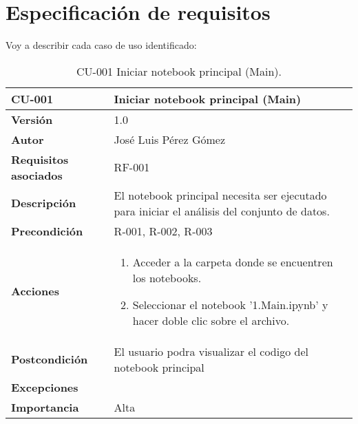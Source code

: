 \section{Especificación de requisitos}

Voy a describir cada caso de uso identificado:


\begin{table}[p]
	\centering
	\begin{tabularx}{\linewidth}{ p{} p{} }
		\toprule
		\textbf{CU-001}    & \textbf{Iniciar notebook principal (Main)}\\
		\toprule
		\textbf{Versión}              & 1.0    \\
		\textbf{Autor}                & José Luis Pérez Gómez \\
		\textbf{Requisitos asociados} & RF-001 \\
		\textbf{Descripción}          & El notebook principal necesita ser ejecutado para iniciar el análisis del conjunto de datos. \\
		\textbf{Precondición}         & R-001, R-002, R-003\\
		\textbf{Acciones}             &
		\begin{enumerate}
			\def\labelenumi{\arabic{enumi}.}
			\tightlist
			\item Acceder a la carpeta donde se encuentren los notebooks.
			\item Seleccionar el notebook '1.Main.ipynb' y hacer doble clic sobre el archivo.
		\end{enumerate}\\
		\textbf{Postcondición}        & El usuario podra visualizar el codigo del notebook principal\\
		\textbf{Excepciones}          &  \\
		\textbf{Importancia}          & Alta \\
		\bottomrule
	\end{tabularx}
	\caption{CU-001 Iniciar notebook principal (Main).}
\end{table}



